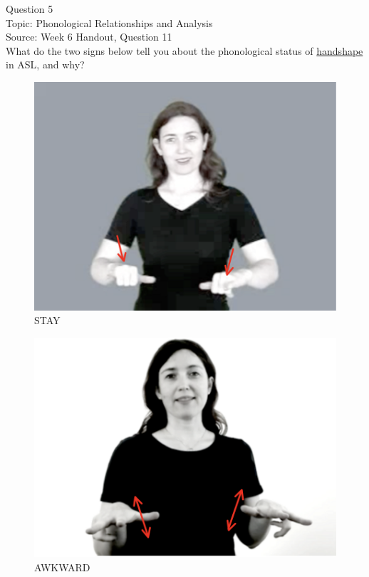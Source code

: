 \documentclass[12pt]{article}
\begin{document}
\newpage

{\large Question 5}\\

Topic: Phonological Relationships and Analysis\\
Source: Week 6 Handout, Question 11\\

What do the two signs below tell you about the phonological status of \underline{handshape} in ASL, and why?\\

\begin{figure}[H]
\includegraphics{../images/asl_stay.png}
\caption{STAY}
\end{figure}
\begin{figure}[H]
\includegraphics{../images/asl_awkward.png}
\caption{AWKWARD}
\end{figure}
\end{document}
